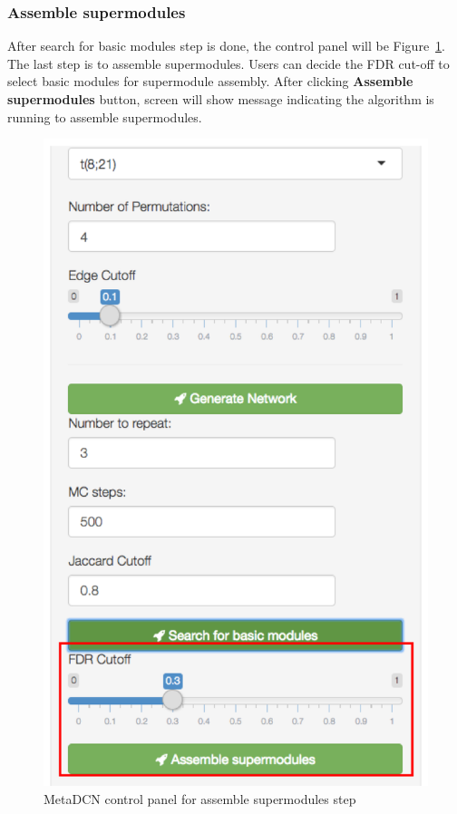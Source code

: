 \subsubsection{Assemble supermodules}
After search for basic modules step is done, the control panel will be Figure~\ref{fig:metaDCNstep3}. The last step is to assemble supermodules. Users can decide the FDR cut-off to select basic modules for supermodule assembly. After clicking \textbf{Assemble supermodules} button, screen will show message indicating the algorithm is running to assemble supermodules.

\begin{figure}[H]
\begin{center}
\includegraphics[scale=0.45]{./figure/metaDCN/metaDCNstep3}
\caption{MetaDCN control panel for assemble supermodules step}
\label{fig:metaDCNstep3}
\end{center}
\end{figure}


